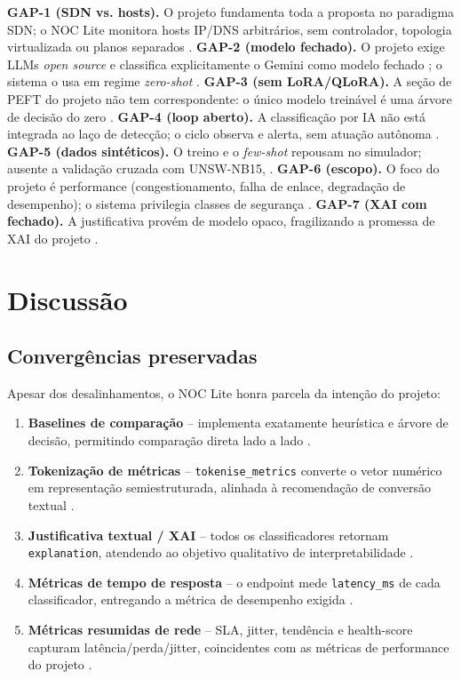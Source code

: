 \documentclass[12pt,a4paper]{article}
\begin{document}
\textbf{GAP-1 (SDN vs. hosts).} O projeto fundamenta toda a proposta no
paradigma SDN; o NOC Lite monitora hosts IP/DNS arbitrários, sem controlador,
topologia virtualizada ou planos separados \cite{rA19}. \textbf{GAP-2 (modelo
fechado).} O projeto exige LLMs \textit{open source} e classifica explicitamente
o Gemini como modelo fechado ; o sistema o usa em regime \textit{
zero-shot} \cite{rA317}. \textbf{GAP-3 (sem LoRA/QLoRA).} A seção de PEFT do projeto
não tem correspondente: o único modelo treinável é uma árvore de decisão do
zero \cite{rA41}\cite{rA42}. \textbf{GAP-4 (loop aberto).} A classificação por IA não está
integrada ao laço de detecção; o ciclo observa e alerta, sem atuação autônoma
\cite{rA133}. \textbf{GAP-5 (dados sintéticos).} O treino e o \textit{few-shot}
repousam no simulador; ausente a validação cruzada com UNSW-NB15,
\cite{rA512}. \textbf{GAP-6 (escopo).} O foco do
projeto é performance (congestionamento, falha de enlace, degradação de
desempenho); o sistema privilegia classes de segurança \cite{rA512}. \textbf{GAP-7
(XAI com fechado).} A justificativa provém de modelo opaco, fragilizando a
promessa de XAI do projeto \cite{rA511}\cite{rA52}.

\section{Discussão}
\label{sec:discussao}

\subsection{Convergências preservadas}
\label{sec:convergencias}

Apesar dos desalinhamentos, o NOC Lite honra parcela da intenção do projeto:

\begin{enumerate}
  \item \textbf{Baselines de comparação} -- implementa exatamente heurística e
  árvore de decisão, permitindo comparação direta lado a lado \cite{rA210}\cite{rA217}.
  \item \textbf{Tokenização de métricas} -- \texttt{tokenise\_metrics} converte
  o vetor numérico em representação semiestruturada, alinhada à recomendação de
  conversão textual \cite{rA616}\cite{rA431}.
  \item \textbf{Justificativa textual / XAI} -- todos os classificadores retornam
  \texttt{explanation}, atendendo ao objetivo qualitativo de interpretabilidade
  \cite{rA511}\cite{rA537}.
  \item \textbf{Métricas de tempo de resposta} -- o endpoint mede
  \texttt{latency\_ms} de cada classificador, entregando a métrica de desempenho
  exigida \cite{rA31}.
  \item \textbf{Métricas resumidas de rede} -- SLA, jitter, tendência e
  health-score capturam latência/perda/jitter, coincidentes com as métricas de
  performance do projeto \cite{rA19}.
\end{enumerate}
\end{document}

